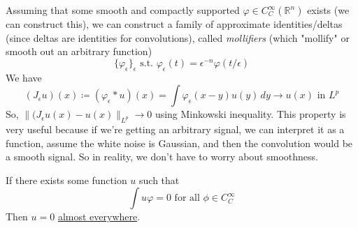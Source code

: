 	Assuming that some smooth and compactly supported $\varphi \in C^\infty_C (\mathbb{R}^n)$ exists (we can construct this), we can construct a family of approximate identities/deltas (since deltas are identities for convolutions), called \textit{mollifiers} (which "mollify" or smooth out an arbitrary function) 
	\begin{equation}
	  \{\varphi_\epsilon\}_\epsilon \text{ s.t. } \varphi_\epsilon (t) = \epsilon^{-n} \varphi(t / \epsilon)
	\end{equation}
	We have 
	\begin{equation}
	  (J_\epsilon u) (x) \coloneqq (\varphi_\epsilon \ast u) (x) = \int \varphi_\epsilon (x - y) u(y) \, dy \rightarrow u(x) \text{ in } L^p
	\end{equation}
	So, $\|(J_\epsilon u (x) - u(x)\|_{L^p} \rightarrow 0$ using Minkowski inequality. This property is very useful because if we're getting an arbitrary signal, we can interpret it as a function, assume the white noise is Gaussian, and then the convolution would be a smooth signal. So in reality, we don't have to worry about smoothness. 

	\begin{theorem}
	  \label{thm:fundamental-lemma-of-the-calculus-of-variations}
	If there exists some function $u$ such that 
	\begin{equation}
	  \int u \varphi = 0 \text{ for all } \phi \in C^\infty_C
	\end{equation}
	Then $u = 0$ \hyperref[mt-def:almost_everywhere]{almost everywhere}. 
	\end{theorem}

